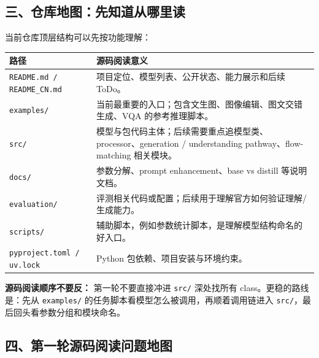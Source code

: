 \subsection{三、仓库地图：先知道从哪里读}

当前仓库顶层结构可以先按功能理解：

\begin{center}
{\small
\begin{tabular}{p{3.2cm}p{9.3cm}}
\hline
\textbf{路径} & \textbf{源码阅读意义} \\
\hline
\texttt{README.md / README\_CN.md} & 项目定位、模型列表、公开状态、能力展示和后续 ToDo。 \\
\texttt{examples/} & 当前最重要的入口；包含文生图、图像编辑、图文交错生成、VQA 的参考推理脚本。 \\
\texttt{src/} & 模型与包代码主体；后续需要重点追模型类、processor、generation / understanding pathway、flow-matching 相关模块。 \\
\texttt{docs/} & 参数分解、prompt enhancement、base vs distill 等说明文档。 \\
\texttt{evaluation/} & 评测相关代码或配置；后续用于理解官方如何验证理解/生成能力。 \\
\texttt{scripts/} & 辅助脚本，例如参数统计脚本，是理解模型结构命名的好入口。 \\
\texttt{pyproject.toml / uv.lock} & Python 包依赖、项目安装与环境约束。 \\
\hline
\end{tabular}
}
\end{center}

\begin{intubox}
\textbf{源码阅读顺序不要反：} 第一轮不要直接冲进 \texttt{src/} 深处找所有 class。更稳的路线是：先从 \texttt{examples/} 的任务脚本看模型怎么被调用，再顺着调用链进入 \texttt{src/}，最后回头看参数分组和模块命名。
\end{intubox}

\subsection{四、第一轮源码阅读问题地图}

